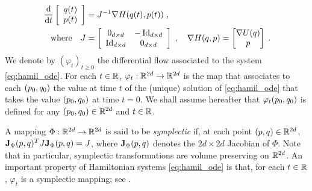 \begin{equation}
  \label{eq:hamil_ode}
  \begin{aligned}
\frac{\mathrm{d} }{\mathrm{d} t}
\left[
  \begin{array}{c}
    q(t) \\
    p(t) \\
  \end{array}
\right]
& = J^{-1} \nabla H(q(t),p(t)) \;, \\
\quad \text{where} \quad  J&= \left[
                                         \begin{array}{cc}
                                           0_{d \times d} & -\operatorname{Id}_{d \times d} \\
                                           \operatorname{Id}_{d \times d} & 0_{d \times d} \\
                                         \end{array}
                                       \right]
                                       \;,
                                       \quad \nabla H(q,p) = \begin{bmatrix} \nabla U(q) \\ p \end{bmatrix}           \;.
                                     \end{aligned}
                                   \end{equation}
We denote by $(\varphi_t)_{t \geq 0}$ the differential flow associated to the system \eqref{eq:hamil_ode}. For each $t \in \mathbb{R}$, $\varphi_t: \mathbb{R}^{2d} \to \mathbb{R}^{2d}$ is the map that associates to each $(p_0,q_0)$ the value at time $t$ of the (unique) solution of \eqref{eq:hamil_ode} that takes the value $(p_0,q_0)$ at time $t=0$. We shall assume hereafter that $\varphi_t(p_0,q_0)$ is defined for any $(p_0,q_0) \in \mathbb{R}^{2d}$ and $t \in \mathbb{R}$.

A mapping $\Phi: \mathbb{R}^{2d} \to \mathbb{R}^{2d}$ is said to be \emph{symplectic} if, at each point $(p,q) \in \mathbb{R}^{2d}$, $\mathbf{J}_{\Phi}(p,q)^T J \mathbf{J}_{\Phi}(p,q)= J$, where $\mathbf{J}_{\Phi}(p,q)$ denotes the $2d \times 2d$ Jacobian of $\Phi$. Note that in particular, %
symplectic transformations are volume preserving on $\mathbb{R}^{2d}$.
An important property of Hamiltonian systems \eqref{eq:hamil_ode} is that, for each $t \in \mathbb{R}$, $\varphi_t$ is a symplectic mapping; see \cite[Theorem~2.1]{bou-rabee:sanz-serna:2018}.

